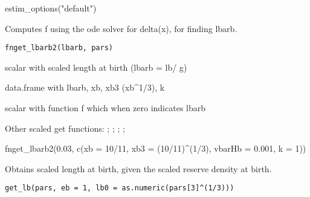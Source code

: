 \documentclass[a4paper]{book}
\begin{document}
%
\begin{Examples}
\begin{ExampleCode}
estim_options("default")
\end{ExampleCode}
\end{Examples}
%
\begin{Description}\relax
Computes f using the ode solver for delta(x), for finding lbarb.
\end{Description}
%
\begin{Usage}
\begin{verbatim}
fnget_lbarb2(lbarb, pars)
\end{verbatim}
\end{Usage}
%
\begin{Arguments}
\begin{ldescription}
\item[\code{lbarb}] scalar with scaled length at birth (lbarb = lb/ g)

\item[\code{pars}] data.frame with lbarb, xb, xb3 (xb\textasciicircum{}1/3), k
\end{ldescription}
\end{Arguments}
%
\begin{Value}
scalar with function f which when zero indicates lbarb
\end{Value}
%
\begin{SeeAlso}\relax
Other scaled get functions: ;
; ;
;
\end{SeeAlso}
%
\begin{Examples}
\begin{ExampleCode}
fnget_lbarb2(0.03, c(xb = 10/11, xb3 = (10/11)^(1/3), vbarHb = 0.001, k = 1))
\end{ExampleCode}
\end{Examples}
%
\begin{Description}\relax
Obtains scaled length at birth, given the scaled reserve density at birth.
\end{Description}
%
\begin{Usage}
\begin{verbatim}
get_lb(pars, eb = 1, lb0 = as.numeric(pars[3]^(1/3)))
\end{verbatim}
\end{Usage}
\end{document}
